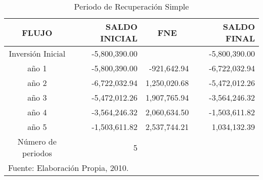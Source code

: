 \begin{table}
    \caption{Periodo de Recuperación Simple}
    \label{tbl:Recuperacion:Simple}
    \centering
    \begin{tabular}{c|r|r|r}
        FLUJO              & SALDO INICIAL &  \multicolumn{1}{c|}{FNE} &   SALDO FINAL \\
        \hline
        \hline
        Inversión Inicial  & -5,800,390.00 &              &  -5,800,390.00 \\
        \hline
        año 1              & -5,800,390.00 & -921,642.94  & -6,722,032.94 \\
        año 2              & -6,722,032.94 & 1,250,020.68 & -5,472,012.26 \\
        año 3              & -5,472,012.26 & 1,907,765.94 & -3,564,246.32 \\
        año 4              & -3,564,246.32 & 2,060,634.50 & -1,503,611.82 \\
        año 5              & -1,503,611.82 & 2,537,744.21 & 1,034,132.39 \\
        \hline
        Número de periodos & 5 \\
        \hline
        \multicolumn{4}{l}{\footnotesize Fuente: Elaboración Propia, 2010.}
    \end{tabular}
\end{table}
